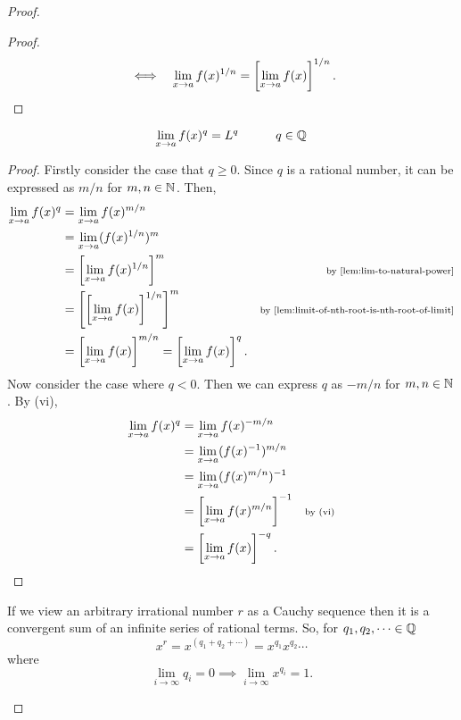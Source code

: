 \documentclass[MathsNotesBase.tex]{subfiles}
\begin{document}
{\begin{proof}
\begin{enumerate}[label=(\roman*)]
{\begin{proof}
\begin{align*}
						&\iff & \lim_{x \to a} f(x)^{1/n} &= \left[\lim_{x \to a} f(x)\right]^{1/n}. \qedhere \\
						\end{align*}
					\end{proof}
					\begin{lemma}
						\[ \lim_{x \to a} f(x)^q = L^q \hspace{30pt} q \in \mathbb{Q}^{} \]
					\end{lemma}
					\begin{proof}
						Firstly consider the case that ${ q \geq 0 }$. Since $q$ is a rational number, it can be expressed as ${ m/n }$ for ${ m,n \in \mathbb{N}^{} }$. Then,
						\begin{align*}
						\lim_{x \to a} f(x)^q &= \lim_{x \to a} f(x)^{m/n} \\
						&= \lim_{x \to a} (f(x)^{1/n})^m &\sidecomment{} \\
						&= \left[\lim_{x \to a} f(x)^{1/n}\right]^m &\sidecomment{by \autoref{lem:lim-to-natural-power}} \\
						&= \left[\left[\lim_{x \to a} f(x)\right]^{1/n}\right]^m &\sidecomment{by \autoref{lem:limit-of-nth-root-is-nth-root-of-limit}} \\
						&= \left[\lim_{x \to a} f(x)\right]^{m/n} = \left[\lim_{x \to a} f(x)\right]^q.
						\end{align*}
						Now consider the case where ${ q < 0 }$. Then we can express $q$ as ${ -m/n }$ for ${ m,n \in \mathbb{N}^{} }$. By (vi), 
						\begin{align*}
						\lim_{x \to a} f(x)^q &= \lim_{x \to a} f(x)^{-m/n} \\
						&= \lim_{x \to a} (f(x)^{-1})^{m/n} &\text{\scriptsize{}} \\
						&= \lim_{x \to a} (f(x)^{m/n})^{-1} &\text{\scriptsize{}} \\
						&= \left[\lim_{x \to a} f(x)^{m/n}\right]^{-1} &\text{\scriptsize{by (vi)}} \\
						&= \left[\lim_{x \to a} f(x)\right]^{-q}. \qedhere
						\end{align*}
					\end{proof}
					If we view an arbitrary irrational number $r$ as a Cauchy sequence then it is a convergent sum of an infinite series of rational terms. So, for ${ q_1,q_2,\dots \in \mathbb{Q}^{} }$
					\[ x^r = x^{(q_1 + q_2 + \cdots)} = x^{q_1}x^{q_2}\cdots \]
					where 
					\[ \lim_{i \to \infty} q_i = 0 \implies \lim_{i \to \infty} x^{q_i} = 1. \]
}
\end{enumerate}
\end{proof}}
\end{document}
